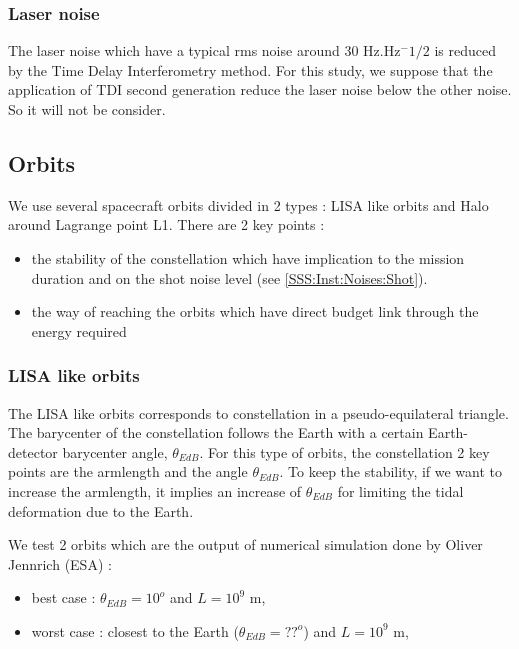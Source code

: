 \documentclass{iopart}
\begin{document}
\subsubsection{Laser noise}
\label{SSS:Inst:Noises:Laser}

The laser noise which have a typical rms noise around 30 Hz.Hz$^-1/2$ is reduced by the Time Delay Interferometry method. 
For this study, we suppose that the application of TDI second generation reduce the laser noise below the other noise.
So it will not be consider.




\subsection{Orbits}
\label{SS:Inst:Orbits}
We use several spacecraft orbits divided in 2 types : LISA like orbits and Halo around Lagrange point L1.
There are 2 key points :
\begin{itemize}
\item the stability of the constellation which have implication to the mission duration and on the shot noise level (see \ref{SSS:Inst:Noises:Shot}).
\item the way of reaching the orbits which have direct budget link through the energy required 
\end{itemize}



\subsubsection{LISA like orbits}
\label{SS:Inst:Orb:LISA}
The LISA like orbits corresponds to  constellation in a pseudo-equilateral triangle. 
The barycenter of the constellation follows the Earth with a certain Earth-detector barycenter angle, $\theta_{EdB}$.
 For this type of orbits, the constellation 2 key points  are the armlength and the angle $\theta_{EdB}$.
 To keep the stability, if we want to increase the armlength, it implies an increase of  $\theta_{EdB}$ for limiting the tidal deformation due to the Earth.
 
 We test 2 orbits which are the output of numerical simulation done by Oliver Jennrich (ESA) : 
\begin{itemize}
\item  best case : $\theta_{EdB} = 10^o$ and $L = 10^9$ m,
\item worst case : closest to the Earth ($\theta_{EdB} = ??^o$) and $L = 10^9$ m,
\end{itemize}
\end{document}
